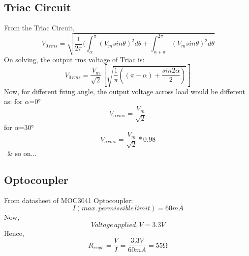         \subsection{Triac Circuit}
             From the Triac Circuit,
             \begin{equation}
            V_{0\,rms}=\sqrt{\frac{1}{2{\pi}}(\int^{\pi}_{\alpha}{{(V_msin\theta)}^2}d\theta+\int^{2\pi}_{\alpha+\pi}{{(V_msin\theta)}^2}d\theta}
             \end{equation}
            On solving, the output rms voltage of Triac is:
            \begin{equation}
            V_{0\,rms}=\frac{V_m}{\sqrt{2}}[\sqrt{\frac{1}{\pi}((\pi-\alpha)+\frac{sin2\alpha}{2})}]
             \end{equation}
             Now, for different firing angle, the output voltage across load would be different as:
             for $\alpha$=\ang{0}
             \begin{equation*}
             V_{o\,rms}=\frac{V_m}{\sqrt{2}}
             \end{equation*}
             for $\alpha$=\ang{30}
             \begin{equation*}
            V_{o\,rms}=\frac{V_m}{\sqrt{2}}*0.98
             \end{equation*}\
             \& so on...
             
             \subsection{Optocoupler}
             From datasheet of MOC3041 Optocoupler:
             \begin{equation}
             I(max.\,permissible\,limit)=60mA
             \end{equation}
             Now, \\
             \begin{equation}
             Voltage\,applied,V=3.3V
             \end{equation}
             Hence,
             \begin{equation}
             R_{reqd.}=\frac{V}{I}=\frac{3.3V}{60mA}=55{\si\ohm}
             \end{equation}
             
